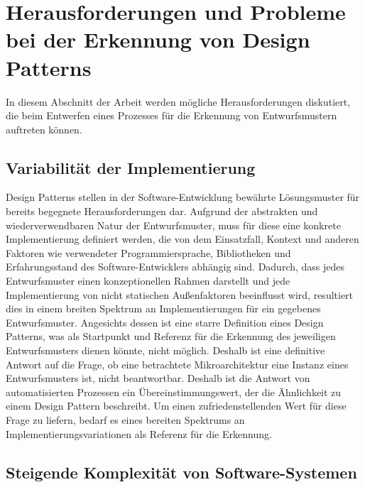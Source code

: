 \section{Herausforderungen und Probleme bei der Erkennung von Design Patterns}

In diesem Abschnitt der Arbeit werden mögliche Herausforderungen diskutiert, die beim Entwerfen eines Prozesses für die Erkennung von Entwurfsmustern auftreten können. 
\subsection*{Variabilität der Implementierung}

Design Patterns stellen in der Software-Entwicklung bewährte Lösungsmuster für bereits begegnete Herausforderungen dar. Aufgrund der abstrakten und wiederverwendbaren Natur der Entwurfsmuster,
muss für diese eine konkrete Implementierung definiert werden, die von dem Einsatzfall, Kontext und anderen Faktoren wie verwendeter Programmiersprache, Bibliotheken und Erfahrungsstand des Software-Entwicklers abhängig sind.
Dadurch, dass jedes Entwurfsmuster einen konzeptionellen Rahmen darstellt und jede Implementierung von nicht statischen Außenfaktoren beeinflusst wird, resultiert dies in einem breiten Spektrum an Implementierungen für ein gegebenes Entwurfsmuster.
Angesichts dessen ist eine starre Definition eines Design Patterns, was als Startpunkt und Referenz für die Erkennung des jeweiligen Entwurfsmusters dienen könnte, nicht möglich. 
Deshalb ist eine definitive Antwort auf die Frage, ob eine betrachtete Mikroarchitektur eine Instanz eines Entwurfsmusters ist, nicht beantwortbar. Deshalb ist die Antwort von automatisierten Prozessen ein Übereinstimmungswert, der die Ähnlichkeit zu einem Design Pattern beschreibt. Um einen zufriedenstellenden Wert für diese Frage zu liefern, bedarf es eines bereiten Spektrums an Implementierungsvariationen als Referenz für die Erkennung.

\subsection*{Steigende Komplexität von Software-Systemen}

